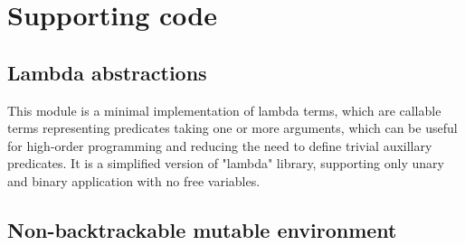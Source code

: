 \appendix
\section{Supporting code}

\subsection{Lambda abstractions}
\label{sec:lambdaki}

This module is a minimal implementation of lambda terms, which are callable terms representing
predicates taking one or more arguments, which can be useful for high-order programming and
reducing the need to define trivial auxillary predicates. It is a simplified version of 
 "lambda" library,
supporting only unary and binary application with no free variables.


\subsection{Non-backtrackable mutable environment}
\label{sec:ccnbenv-imp}

